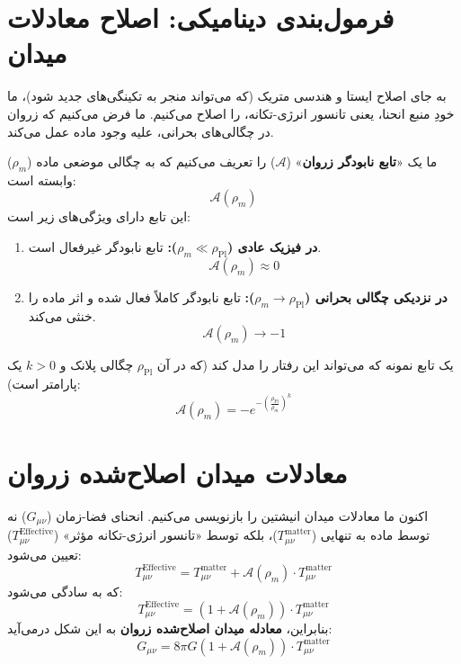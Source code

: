 \documentclass[12pt,a4paper]{article}
\begin{document}
\section{فرمول‌بندی دینامیکی: اصلاح معادلات میدان}
به جای اصلاح ایستا و هندسی متریک (که می‌تواند منجر به تکینگی‌های جدید شود)، ما خودِ منبع انحنا، یعنی تانسور انرژی-تکانه، را اصلاح می‌کنیم. ما فرض می‌کنیم که زروان در چگالی‌های بحرانی، علیه وجود ماده عمل می‌کند.

ما یک «\textbf{تابع نابودگر زروان}» ($\mathcal{A}$) را تعریف می‌کنیم که به چگالی موضعی ماده ($\rho_m$) وابسته است:
$$ \mathcal{A}(\rho_m) $$
این تابع دارای ویژگی‌های زیر است:
\begin{enumerate}
    \item \textbf{در فیزیک عادی ($\rho_m \ll \rho_{\text{Pl}}$):} تابع نابودگر غیرفعال است.
    $$ \mathcal{A}(\rho_m) \approx 0 $$
    \item \textbf{در نزدیکی چگالی بحرانی ($\rho_m \to \rho_{\text{Pl}}$):} تابع نابودگر کاملاً فعال شده و اثر ماده را خنثی می‌کند.
    $$ \mathcal{A}(\rho_m) \to -1 $$
\end{enumerate}
یک تابع نمونه که می‌تواند این رفتار را مدل کند (که در آن $\rho_{\text{Pl}}$ چگالی پلانک و $k>0$ یک پارامتر است):
$$ \mathcal{A}(\rho_m) = -e^{-(\frac{\rho_{\text{Pl}}}{\rho_m})^k} $$

\section{معادلات میدان اصلاح‌شده زروان}
اکنون ما معادلات میدان انیشتین را بازنویسی می‌کنیم. انحنای فضا-زمان ($G_{\mu\nu}$) نه توسط ماده به تنهایی ($T_{\mu\nu}^{\text{matter}}$)، بلکه توسط «تانسور انرژی-تکانه مؤثر» ($T_{\mu\nu}^{\text{Effective}}$) تعیین می‌شود:
$$ T_{\mu\nu}^{\text{Effective}} = T_{\mu\nu}^{\text{matter}} + \mathcal{A}(\rho_m) \cdot T_{\mu\nu}^{\text{matter}} $$
که به سادگی می‌شود:
$$ T_{\mu\nu}^{\text{Effective}} = (1 + \mathcal{A}(\rho_m)) \cdot T_{\mu\nu}^{\text{matter}} $$
بنابراین، \textbf{معادله میدان اصلاح‌شده زروان} به این شکل درمی‌آید:
$$ G_{\mu\nu} = 8\pi G (1 + \mathcal{A}(\rho_m)) \cdot T_{\mu\nu}^{\text{matter}} $$

\end{document}
